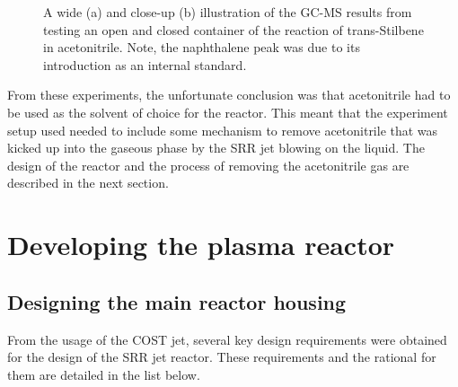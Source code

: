 \begin{figure}
    \caption{\small A wide (a) and close-up (b) illustration of the GC-MS results from testing an open and closed container of the reaction of trans-Stilbene in acetonitrile. Note, the naphthalene peak was due to its introduction as an internal standard.} 
    \label{fig:open_vs_closed_cost_jet_results}
\end{figure}

From these experiments, the unfortunate conclusion was that acetonitrile had to be used as the solvent of choice for the reactor. This meant that the experiment setup used needed to include some mechanism to remove acetonitrile that was kicked up into the gaseous phase by the SRR jet blowing on the liquid. The design of the reactor and the process of removing the acetonitrile gas are described in the next section.

\pagebreak

\section{Developing the plasma reactor}
\subsection{Designing the main reactor housing}

From the usage of the COST jet, several key design requirements were obtained for the  design of the SRR jet reactor. These requirements and the rational for them are detailed in the list below.


